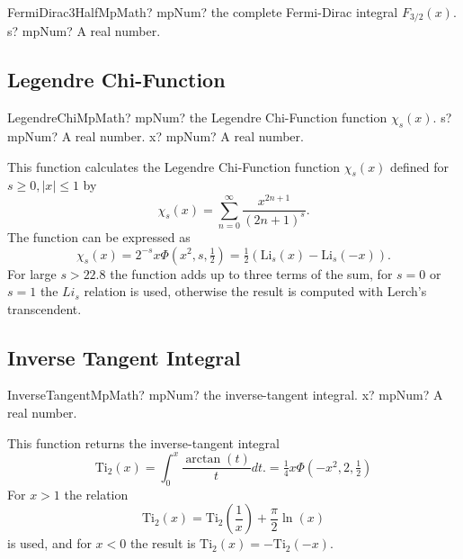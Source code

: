 \begin{mpFunctionsExtract}
	\mpFunctionOneNotImplemented
	{FermiDirac3HalfMpMath? mpNum? the complete Fermi-Dirac integral $F_{3/2}(x)$.}
	{s? mpNum? A real number.}
\end{mpFunctionsExtract}




\subsection{Legendre Chi-Function}

\begin{mpFunctionsExtract}
	\mpFunctionTwoNotImplemented
	{LegendreChiMpMath? mpNum? the Legendre Chi-Function function $\chi_s(x)$.}
	{s? mpNum? A real number.}
	{x? mpNum? A real number.}
\end{mpFunctionsExtract}

\vspace{0.3cm}
This function calculates the Legendre Chi-Function function $\chi_s(x)$ defined for $s \geq 0, |x|\leq 1$ by
\begin{equation}
	\chi_s(x)=\sum_{n=0}^\infty \frac{x^{2n+1}}{(2n+1)^s}.
\end{equation}
The function can be expressed as 
\begin{equation}
	\chi_s(x)=2^{-s} x \Phi\left(x^2,s,\tfrac{1}{2}\right) = \tfrac{1}{2}\left(\text{Li}_s(x)-\text{Li}_s(-x) \right).
\end{equation}
For large $s > 22.8$ the function adds up to three terms of the sum,
for $s = 0$ or $s = 1$ the $Li_s$ relation is used, otherwise the result is computed with Lerch's transcendent.




\subsection{Inverse Tangent Integral}

\begin{mpFunctionsExtract}
	\mpFunctionOneNotImplemented
	{InverseTangentMpMath? mpNum? the inverse-tangent integral.}
	{x? mpNum? A real number.}
\end{mpFunctionsExtract}


\vspace{0.3cm}
This function returns the inverse-tangent integral
\begin{equation}
	\text{Ti}_2(x) = \int_0^x \frac{\arctan(t)}{t} dt. = \tfrac{1}{4} x \Phi \left(-x^2,2,\tfrac{1}{2}\right)
\end{equation}
For $x>1$ the relation
\begin{equation}
	\text{Ti}_2(x) = \text{Ti}_2\left(\frac{1}{x}\right) + \frac{\pi}{2} \ln(x)
\end{equation}
is used, and for $x<0$ the result is $\text{Ti}_2(x) = -\text{Ti}_2(-x)$.






